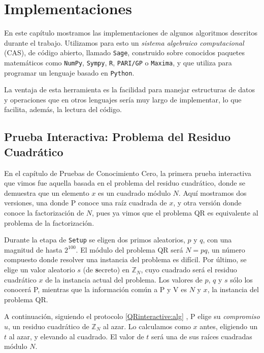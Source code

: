 
\chapter{Implementaciones}\label{ch:implementaciones} 

En este capítulo mostramos las implementaciones de algunos algoritmos descritos durante el trabajo. Utilizamos para esto un \textit{sistema algebraico computacional} (CAS), de código abierto, llamado \texttt{Sage}, construido sobre conocidos paquetes matemáticos como \texttt{NumPy}, \texttt{Sympy}, \texttt{R}, \texttt{PARI/GP} o \texttt{Maxima}, y que utiliza para programar un lenguaje basado en \texttt{Python}.

La ventaja de esta herramienta es la facilidad para manejar estructuras de datos y operaciones que en otros lenguajes sería muy largo de implementar, lo que facilita, además, la lectura del código.


\section{Prueba Interactiva: Problema del Residuo Cuadrático}


En el capítulo de Pruebas de Conocimiento Cero, la primera prueba interactiva que vimos fue aquella basada en el problema del residuo cuadrático, donde se demuestra que un elemento $x$ es un cuadrado módulo $N$. Aquí mostramos dos versiones, una donde P conoce una raíz cuadrada de $x$, y otra versión donde conoce la factorización de $N$, pues ya vimos que el problema QR es equivalente al problema de la factorización.






Durante la etapa de \texttt{Setup} se eligen dos primos aleatorios, $p$ y $q$, con una magnitud de hasta $2^{100}$. El módulo del problema QR será $N=pq$, un número compuesto donde resolver una instancia del problema es difícil. Por último, se elige un valor aleatorio $s$ (de \textbf{s}ecreto) en $\mathbb{Z}_N$, cuyo cuadrado será el residuo cuadrático $x$ de la instancia actual del problema. Los valores de $p$, $q$ y $s$ sólo los conocerá P, mientras que la información común a P y V es $N$ y $x$, la instancia del problema QR.

A continuación, siguiendo el protocolo \ref{QRinteractive:alg} , P elige su \textit{compromiso} $u$, un residuo cuadrático de $\mathbb{Z}_N$ al azar. Lo calculamos como $x$ antes, eligiendo un $t$ al azar, y elevando al cuadrado. El valor de $t$ será una de sus raíces cuadradas módulo $N$.

